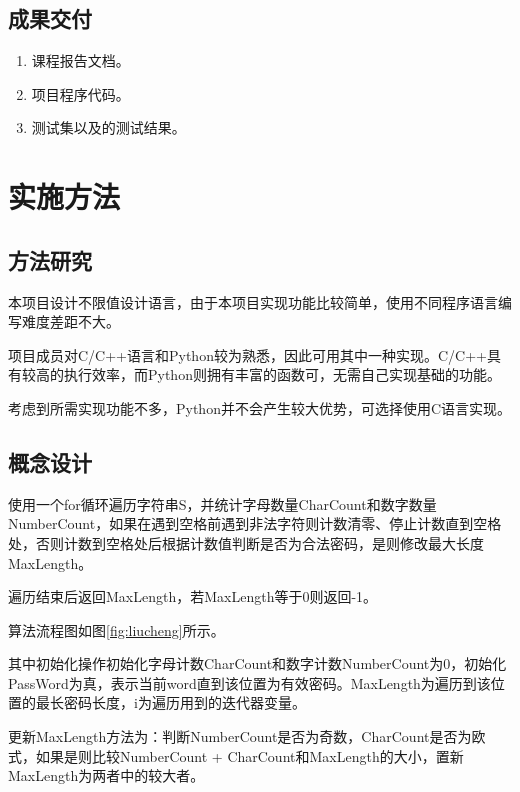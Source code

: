 \begin{spacing}{1.5}
    \subsection{成果交付}
    \begin{enumerate} [\indent 1、]
        \item 课程报告文档。
        \item 项目程序代码。
        \item 测试集以及的测试结果。
    \end{enumerate}
    \section{实施方法}
    \subsection{方法研究}
    本项目设计不限值设计语言，由于本项目实现功能比较简单，使用不同程序语言编写难度差距不大。

    项目成员对C/C++语言和Python较为熟悉，因此可用其中一种实现。C/C++具有较高的执行效率，而Python则拥有丰富的函数可，无需自己实现基础的功能。

    考虑到所需实现功能不多，Python并不会产生较大优势，可选择使用C语言实现。

    \subsection{概念设计}
    使用一个for循环遍历字符串S，并统计字母数量CharCount和数字数量NumberCount，如果在遇到空格前遇到非法字符则计数清零、停止计数直到空格处，否则计数到空格处后根据计数值判断是否为合法密码，是则修改最大长度MaxLength。

    遍历结束后返回MaxLength，若MaxLength等于0则返回-1。

    算法流程图如图\ref{fig:liucheng}所示。

    

   其中初始化操作初始化字母计数CharCount和数字计数NumberCount为0，初始化PassWord为真，表示当前word直到该位置为有效密码。MaxLength为遍历到该位置的最长密码长度，i为遍历用到的迭代器变量。
   
   更新MaxLength方法为：判断NumberCount是否为奇数，CharCount是否为欧式，如果是则比较NumberCount + CharCount和MaxLength的大小，置新MaxLength为两者中的较大者。


\end{spacing}

